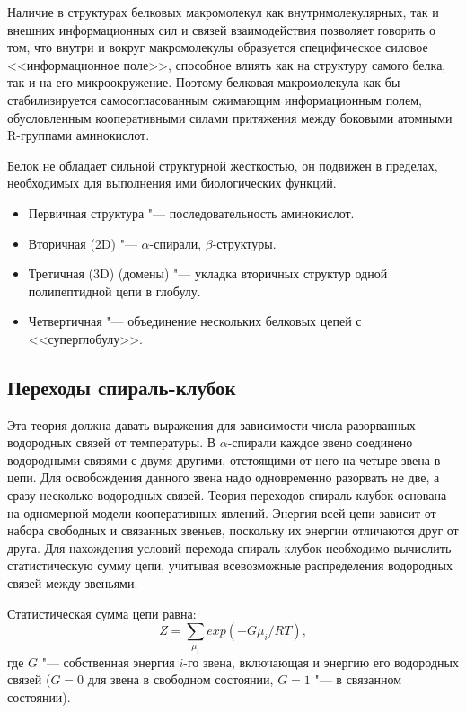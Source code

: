 \documentclass[12pt,a4paper,oneside]{book}
\begin{document}
Наличие в структурах белковых макромолекул как внутримолекулярных, так и внешних информационных сил и связей взаимодействия позволяет говорить о том, что внутри и вокруг макромолекулы образуется специфическое силовое <<информационное поле>>, способное влиять как на структуру самого белка, так и на его микроокружение. Поэтому белковая макромолекула как бы стабилизируется самосогласованным сжимающим информационным полем, обусловленным кооперативными силами притяжения между боковыми атомными R-группами аминокислот.

Белок не обладает сильной структурной жесткостью, он подвижен в пределах, необходимых для выполнения ими биологических функций.

\begin{itemize}
\item Первичная структура "--- последовательность аминокислот.
\item Вторичная (2D) "--- $\alpha$-спирали, $\beta$-структуры.
\item Третичная (3D) (домены) "--- укладка вторичных структур одной полипептидной цепи в глобулу.
\item Четвертичная "--- объединение нескольких белковых цепей с <<суперглобулу>>.
\end{itemize}



\subsection{Переходы спираль-клубок}

Эта теория должна давать выражения для зависимости числа разорванных водородных связей от температуры. В $\alpha$-спирали каждое звено соединено водородными связями с двумя другими, отстоящими от него на четыре звена в цепи. Для освобождения данного звена надо одновременно разорвать не две, а сразу несколько водородных связей. Теория переходов спираль-клубок основана на одномерной модели кооперативных явлений. Энергия всей цепи зависит от набора свободных и связанных звеньев, поскольку их энергии отличаются друг от друга. Для нахождения условий перехода спираль-клубок необходимо вычислить статистическую сумму цепи, учитывая всевозможные распределения водородных связей между звеньями.

Статистическая сумма цепи равна:
\begin{equation}
	Z = \sum_{\mu_i} exp ( -G {\mu_i} / RT ),
\end{equation}
где $G$ "--- собственная энергия $i$-го звена, включающая и энергию его водородных связей ($G=0$ для
звена в свободном состоянии, $G=1$ "--- в связанном состоянии).
\end{document}
